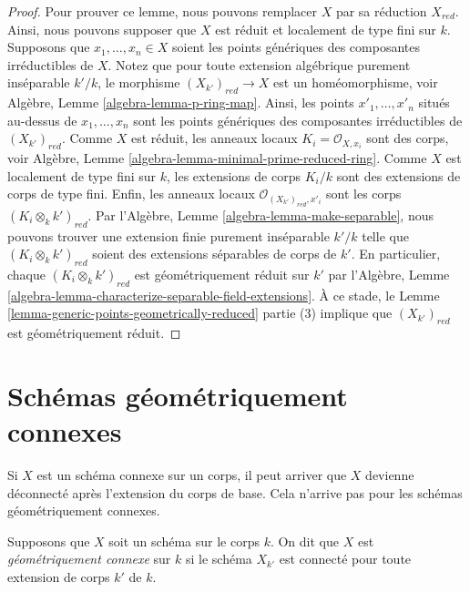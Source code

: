 \begin{proof}
Pour prouver ce lemme, nous pouvons remplacer $X$ par sa
réduction $X_{red}$. Ainsi, nous pouvons supposer que $X$
est réduit et localement de type fini sur $k$. Supposons que
$x_1, \ldots, x_n \in X$ soient les points génériques des
composantes irréductibles de $X$. Notez que pour toute
extension algébrique purement inséparable $k'/k$, le
morphisme $(X_{k'})_{red} \to X$ est un homéomorphisme, voir
Algèbre, Lemme \ref{algebra-lemma-p-ring-map}. Ainsi, les
points $x'_1, \ldots, x'_n$ situés au-dessus de $x_1, \ldots,
x_n$ sont les points génériques des composantes irréductibles
de $(X_{k'})_{red}$. Comme $X$ est réduit, les anneaux locaux
$K_i = \mathcal{O}_{X, x_i}$ sont des corps, voir Algèbre,
Lemme \ref{algebra-lemma-minimal-prime-reduced-ring}. Comme
$X$ est localement de type fini sur $k$, les extensions de
corps $K_i/k$ sont des extensions de corps de type fini.
Enfin, les anneaux locaux $\mathcal{O}_{(X_{k'})_{red}, x'_i}$
sont les corps $(K_i \otimes_k k')_{red}$. Par l'Algèbre,
Lemme \ref{algebra-lemma-make-separable}, nous pouvons trouver
une extension finie purement inséparable $k'/k$ telle que $(K_i
\otimes_k k')_{red}$ soient des extensions séparables de corps
de $k'$. En particulier, chaque $(K_i \otimes_k k')_{red}$ est
géométriquement réduit sur $k'$ par l'Algèbre, Lemme
\ref{algebra-lemma-characterize-separable-field-extensions}. À ce
stade, le Lemme \ref{lemma-generic-points-geometrically-reduced}
partie (3) implique que $(X_{k'})_{red}$ est géométriquement réduit.
\end{proof}







\section{Schémas géométriquement connexes}
\label{section-geometrically-connected}

\noindent
Si $X$ est un schéma connexe sur un corps, il peut arriver
que $X$ devienne déconnecté après l'extension du corps de
base. Cela n'arrive pas pour les schémas géométriquement connexes.

\begin{definition}
\label{definition-geometrically-connected}
Supposons que $X$ soit un schéma sur le corps $k$. On dit que
$X$ est {\it géométriquement connexe } sur $k$ si le schéma
$X_{k'}$ est connecté pour toute extension de corps $k'$ de $k$.
\end{definition}

